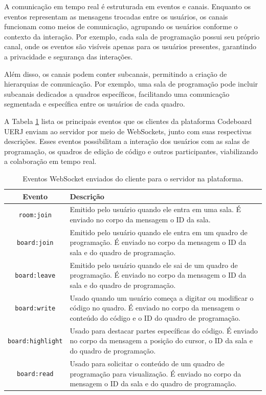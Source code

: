 A comunicação em tempo real é estruturada em eventos e canais. Enquanto os eventos representam as mensagens trocadas entre os usuários, os canais funcionam como meios de comunicação, agrupando os usuários conforme o contexto da interação. Por exemplo, cada sala de programação possui seu próprio canal, onde os eventos são visíveis apenas para os usuários presentes, garantindo a privacidade e segurança das interações.

Além disso, os canais podem conter subcanais, permitindo a criação de hierarquias de comunicação. Por exemplo, uma sala de programação pode incluir subcanais dedicados a quadros específicos, facilitando uma comunicação segmentada e específica entre os usuários de cada quadro.

A Tabela \ref{tab:websocket-client-to-server-events}  lista os principais eventos que os clientes da plataforma Codeboard UERJ enviam ao servidor por meio de WebSockets, junto com suas respectivas descrições. Esses eventos possibilitam a interação dos usuários com as salas de programação, os quadros de edição de código e outros participantes, viabilizando a colaboração em tempo real.

\begin{table}[H]
    \centering
    \caption{Eventos WebSocket enviados do cliente para o servidor na plataforma.}
    \label{tab:websocket-client-to-server-events}
    \renewcommand{\arraystretch}{1.3} 
    \begin{tabular}{|c|p{10cm}|}
        \hline
        \textbf{Evento} & \textbf{Descrição} \\
        \hline
        \texttt{room:join} & Emitido pelo usuário quando ele entra em uma sala. É enviado no corpo da mensagem o ID da sala. \\
        \hline
        \texttt{board:join} & Emitido pelo usuário quando ele entra em um quadro de programação. É enviado no corpo da mensagem o ID da sala e do quadro de programação. \\
        \hline
        \texttt{board:leave} & Emitido pelo usuário quando ele sai de um quadro de programação. É enviado no corpo da mensagem o ID da sala e do quadro de programação. \\
        \hline
        \texttt{board:write} & Usado quando um usuário começa a digitar ou modificar o código no quadro. É enviado no corpo da mensagem o conteúdo do código e o ID do quadro de programação. \\
        \hline
        \texttt{board:highlight} & Usado para destacar partes específicas do código. É enviado no corpo da mensagem a posição do cursor, o ID da sala e do quadro de programação. \\
        \hline
        \texttt{board:read} & Usado para solicitar o conteúdo de um quadro de programação para visualização. É enviado no corpo da mensagem o ID da sala e do quadro de programação. \\
        \hline
    \end{tabular}
\end{table}


